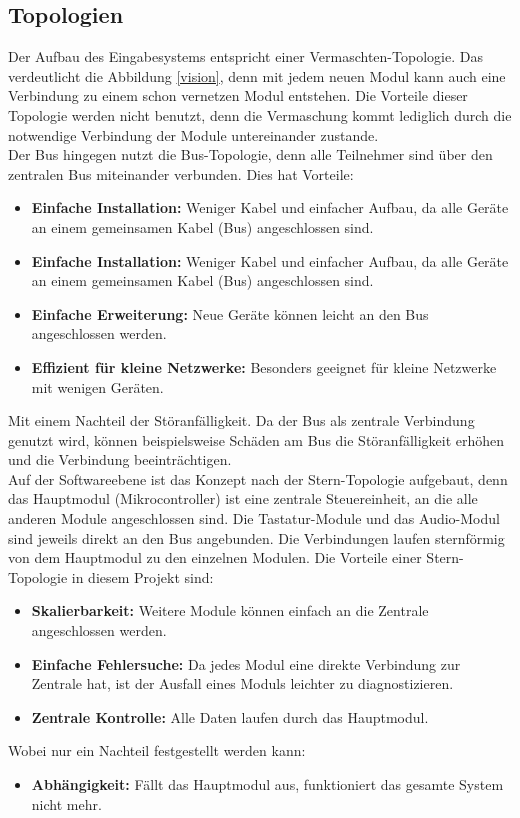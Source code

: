  
 \subsection{Topologien}
 Der Aufbau des Eingabesystems entspricht einer Vermaschten-Topologie. Das verdeutlicht die Abbildung \ref{vision}, denn mit jedem neuen Modul kann auch eine Verbindung zu einem schon vernetzen Modul entstehen. Die Vorteile dieser Topologie werden nicht benutzt, denn die Vermaschung kommt lediglich durch die notwendige Verbindung der Module untereinander zustande.\\

 Der Bus hingegen nutzt die Bus-Topologie, denn alle Teilnehmer sind über den zentralen Bus miteinander verbunden. Dies hat Vorteile:
\begin{itemize}
    \item \textbf{Einfache Installation:} Weniger Kabel und einfacher Aufbau, da alle Geräte an einem gemeinsamen Kabel (Bus) angeschlossen sind.
    \item\textbf{Einfache Installation:} Weniger Kabel und einfacher Aufbau, da alle Geräte an einem gemeinsamen Kabel (Bus) angeschlossen sind.
    \item\textbf{Einfache Erweiterung:} Neue Geräte können leicht an den Bus angeschlossen werden. 
    \item\textbf{Effizient für kleine Netzwerke:} Besonders geeignet für kleine Netzwerke mit wenigen Geräten. 
\end{itemize}
Mit einem Nachteil der Störanfälligkeit. Da der Bus als zentrale Verbindung genutzt wird, können beispielsweise Schäden am Bus die Störanfälligkeit erhöhen und die Verbindung beeinträchtigen.\\

Auf der Softwareebene ist das Konzept nach der Stern-Topologie aufgebaut, denn das Hauptmodul (Mikrocontroller) ist eine zentrale Steuereinheit, an die alle anderen Module angeschlossen sind. Die Tastatur-Module und das Audio-Modul sind jeweils direkt an den Bus angebunden. Die Verbindungen laufen sternförmig von dem Hauptmodul zu den einzelnen Modulen. Die Vorteile einer Stern-Topologie in diesem Projekt sind:
\begin{itemize}
    \item \textbf{Skalierbarkeit:} Weitere Module können einfach an die Zentrale angeschlossen werden.
    \item \textbf{Einfache Fehlersuche:} Da jedes Modul eine direkte Verbindung zur Zentrale hat, ist der Ausfall eines Moduls leichter zu diagnostizieren.
    \item \textbf{Zentrale Kontrolle:} Alle Daten laufen durch das Hauptmodul.
\end{itemize}
Wobei nur ein Nachteil festgestellt werden kann:
\begin{itemize}
    \item \textbf{Abhängigkeit:} Fällt das Hauptmodul aus, funktioniert das gesamte System nicht mehr.
\end{itemize}
